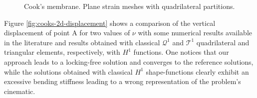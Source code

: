 \documentclass[english,11pt,3p,number,sort&compress]{elsarticle}
\begin{document}
\begin{figure}[H]
	\centering
	 \hfill
	 \hfill
	 \hfill
	\caption{Cook's membrane. Plane strain meshes with quadrilateral partitions.}
	\label{fig:cooks-2d-quad-meshes}
\end{figure}

Figure \ref{fig:cooks-2d-displacement} shows a comparison of the vertical displacement of point A for two values of $\nu$ with some numerical results available in the literature \cite{elguedj2008b,cesar1999new} and results obtained with classical $\mathcal{Q}^1$ and $\mathcal{T}^1$ quadrilateral and triangular elements, respectively, with $H^1$ functions. One notices that our approach leads to a locking-free solution and converges to the reference solutions, while the solutions obtained with classical $H^1$ shape-functions clearly exhibit an excessive bending stiffness leading to a wrong representation of the problem's cinematic.
\end{document}
